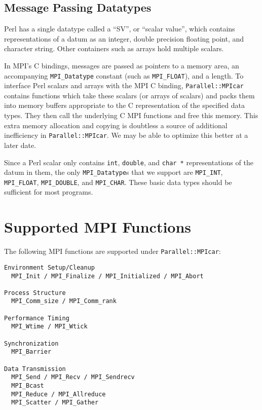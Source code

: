 \documentclass{report}
\begin{document}
\subsection*{Message Passing Datatypes}

	Perl has a single datatype called a ``SV'', or ``scalar
value'', which contains representations of a datum as an integer,
double precision floating point, and character string.  Other
containers such as arrays hold multiple scalars.

	In MPI's C bindings, messages are passed as pointers to a
memory area, an accompanying \verb|MPI_Datatype| constant (such as
\verb|MPI_FLOAT|), and a length.  To interface Perl scalars and arrays 
with the MPI C binding, \verb|Parallel::MPIcar| contains functions which
take these scalars (or arrays of scalars) and packs them into memory buffers
appropriate to the C representation of the specified data types.  They then
call the underlying C MPI functions and free this memory.  This extra memory
allocation and copying is doubtless a source of additional
inefficiency in \verb|Parallel::MPIcar|.  We may be able to optimize this 
better at a later date.

	Since a Perl scalar only contains \verb|int|, \verb|double|, and
\verb|char *| representations of the datum in them, the only
\verb|MPI_Datatype|s that we support are \verb|MPI_INT|,
\verb|MPI_FLOAT|, \verb|MPI_DOUBLE|, and \verb|MPI_CHAR|.   These basic
data types should be sufficient for most programs. 

\section*{Supported MPI Functions}

The following MPI functions are supported under \verb|Parallel::MPIcar|:

\begin{verbatim}
Environment Setup/Cleanup
  MPI_Init / MPI_Finalize / MPI_Initialized / MPI_Abort

Process Structure
  MPI_Comm_size / MPI_Comm_rank

Performance Timing
  MPI_Wtime / MPI_Wtick

Synchronization
  MPI_Barrier

Data Transmission
  MPI_Send / MPI_Recv / MPI_Sendrecv
  MPI_Bcast
  MPI_Reduce / MPI_Allreduce
  MPI_Scatter / MPI_Gather		  
\end{verbatim}
\end{document}
